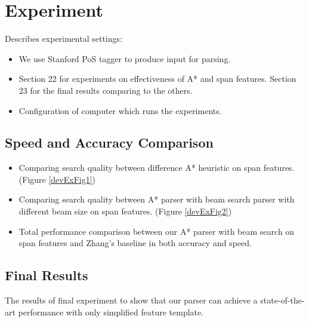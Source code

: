 \section{Experiment}
	Describes experimental settings:
	\begin{itemize}
		\item We use Stanford PoS tagger to produce input for parsing.
		\item Section 22 for experiments on effectiveness of A* and span features. Section 23 for the final results comparing to the others.
		\item Configuration of computer which runs the experiments.
	\end{itemize}
	
	
\subsection{Speed and Accuracy Comparison}
	\begin{itemize}
		\item Comparing search quality between difference A* heuristic on span features. (Figure \ref{devExFig1})
		\item Comparing search quality between A* parser with beam search parser with different beam size on span features. (Figure \ref{devExFig2})
		\item Total performance comparison between our A* parser with beam search on span features and Zhang's baseline in both accuracy and speed.
	\end{itemize}
	
	
\subsection{Final Results}
	The results of final experiment to show that our parser can achieve a state-of-the-art performance with only simplified feature template.
	
		
	